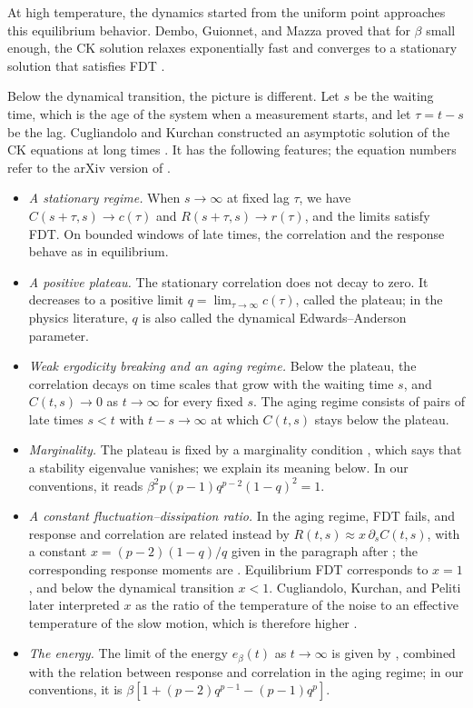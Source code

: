 At high temperature, the dynamics started from the uniform point approaches this equilibrium behavior. Dembo, Guionnet, and Mazza proved that for $\beta$ small enough, the CK solution relaxes exponentially fast and converges to a stationary solution that satisfies FDT \cite[Proposition~1.2 and Theorem~1.3]{dgm2007}.

Below the dynamical transition, the picture is different. Let $s$ be the waiting time, which is the age of the system when a measurement starts, and let $\tau=t-s$ be the lag. Cugliandolo and Kurchan constructed an asymptotic solution of the CK equations at long times \cite{ck1993}. It has the following features; the equation numbers refer to the arXiv version of \cite{ck1993}.
\begin{itemize}
\item \emph{A stationary regime.} When $s\to\infty$ at fixed lag $\tau$, we have $C(s+\tau,s)\to c(\tau)$ and $R(s+\tau,s)\to r(\tau)$, and the limits satisfy FDT. On bounded windows of late times, the correlation and the response behave as in equilibrium.
\item \emph{A positive plateau.} The stationary correlation does not decay to zero. It decreases to a positive limit $q=\lim_{\tau\to\infty}c(\tau)$, called the plateau; in the physics literature, $q$ is also called the dynamical Edwards--Anderson parameter.
\item \emph{Weak ergodicity breaking and an aging regime.} Below the plateau, the correlation decays on time scales that grow with the waiting time $s$, and $C(t,s)\to0$ as $t\to\infty$ for every fixed $s$. The aging regime consists of pairs of late times $s<t$ with $t-s\to\infty$ at which $C(t,s)$ stays below the plateau.
\item \emph{Marginality.} The plateau is fixed by a marginality condition \cite[Equation~(7)]{ck1993}, which says that a stability eigenvalue vanishes; we explain its meaning below. In our conventions, it reads $\beta^2p(p-1)q^{p-2}(1-q)^2=1$.
\item \emph{A constant fluctuation--dissipation ratio.} In the aging regime, FDT fails, and response and correlation are related instead by $R(t,s)\approx x\,\partial_sC(t,s)$, with a constant $x=(p-2)(1-q)/q$ given in the paragraph after \cite[Equation~(12)]{ck1993}; the corresponding response moments are \cite[Equation~(13)]{ck1993}. Equilibrium FDT corresponds to $x=1$, and below the dynamical transition $x<1$. Cugliandolo, Kurchan, and Peliti later interpreted $x$ as the ratio of the temperature of the noise to an effective temperature of the slow motion, which is therefore higher \cite{ckp1997}.
\item \emph{The energy.} The limit of the energy $e_\beta(t)$ as $t\to\infty$ is given by \cite[Equation~(9)]{ck1993}, combined with the relation between response and correlation in the aging regime; in our conventions, it is $\beta[1+(p-2)q^{p-1}-(p-1)q^p]$.
\end{itemize}
